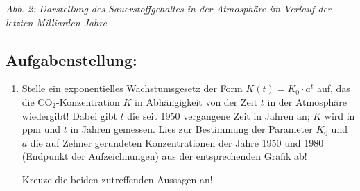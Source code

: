 \begin{langesbeispiel}
	\begin{center}
	\end{center}
	\begin{footnotesize}\begin{singlespace}\textit{Abb. 2: Darstellung des Sauerstoffgehaltes in der Atmosphäre im Verlauf der letzten Milliarden Jahre}\end{singlespace}\end{footnotesize}
	
\subsection{Aufgabenstellung:}
\begin{enumerate}
	\item Stelle ein exponentielles Wachstumsgesetz der Form $K(t)=K_0\cdot a^t$ auf, das die CO$_2$-Konzentration $K$ in Abhängigkeit von der Zeit $t$ in der Atmosphäre wiedergibt! Dabei gibt $t$ die seit 1950 vergangene Zeit in Jahren an; $K$ wird in ppm und $t$ in Jahren gemessen. Lies zur Bestimmung der Parameter $K_0$ und $a$ die auf Zehner gerundeten Konzentrationen der Jahre 1950 und 1980 (Endpunkt der Aufzeichnungen) aus der entsprechenden Grafik ab!
	
	Kreuze die beiden zutreffenden Aussagen an!
	

\end{enumerate}
\end{langesbeispiel}
